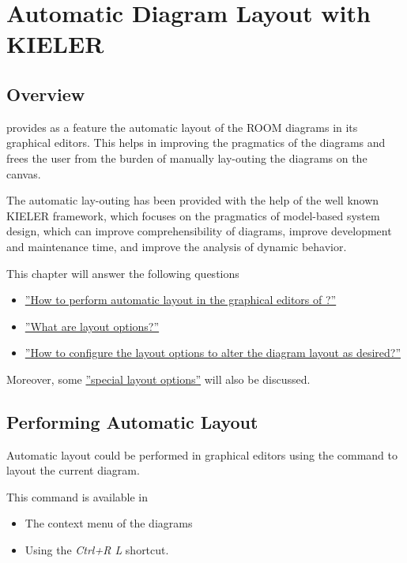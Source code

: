 \section{Automatic Diagram Layout with KIELER}

\subsection{Overview}

\eTrice{} provides as a feature the automatic layout of the ROOM diagrams in its graphical editors. This 
helps in improving the pragmatics of the diagrams and frees the user from the burden of manually 
lay-outing the diagrams on the canvas. 

The automatic lay-outing has been provided with the help of the well known KIELER framework, which focuses 
on the pragmatics of model-based system design, which can improve comprehensibility of diagrams, improve 
development and maintenance time, and improve the analysis of dynamic behavior.

This chapter will answer the following questions
\begin{itemize}
\item \hyperref[performLayout]{''How to perform automatic layout in the graphical editors of \eTrice{}?''}
\item \hyperref[layoutOptions]{''What are layout options?''}
\item \hyperref[configureOptions]{''How to configure the layout options to alter the diagram layout as 
desired?''}
\end{itemize}

Moreover, some \hyperref[specialOptions]{''special layout options''} will also be discussed.

\subsection{Performing Automatic Layout}
\label{performLayout}

Automatic layout could be performed in \eTrice{} graphical editors using the command to layout the current 
diagram.

This command is available in

\begin{itemize}
\item The context menu of the diagrams
\item Using the \textit{Ctrl+R L} shortcut.
\end{itemize}

